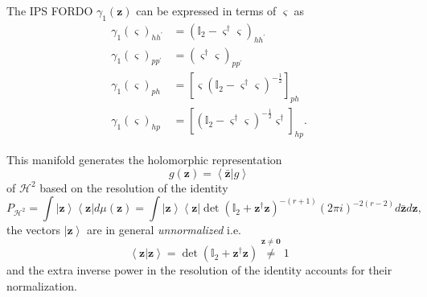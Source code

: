 \documentclass[aps,preprint]{revtex4}%
\begin{document}
The IPS FORDO $\gamma_{1}\left(  \mathbf{z}\right)  $ can be expressed in
terms of $\mathbf{\varsigma}$ as
\begin{align}
\gamma_{1}\left(  \mathbf{\varsigma}\right)  _{hh^{\prime}}  &  =\left(
\mathbb{I}_{2}-\mathbf{\varsigma}^{\dagger}\mathbf{\varsigma}\right)
_{hh^{\prime}}\nonumber\\
\gamma_{1}\left(  \mathbf{\varsigma}\right)  _{pp^{\prime}}  &  =\left(
\mathbf{\varsigma}^{\dagger}\mathbf{\varsigma}\right)  _{pp^{\prime}%
}\nonumber\\
\gamma_{1}\left(  \mathbf{\varsigma}\right)  _{ph}  &  =\left[
\mathbf{\varsigma}\left(  \mathbb{I}_{2}-\mathbf{\varsigma}^{\dagger
}\mathbf{\varsigma}\right)  ^{-\frac{1}{2}}\right]  _{ph}\nonumber\\
\gamma_{1}\left(  \mathbf{\varsigma}\right)  _{hp}  &  =\left[  \left(
\mathbb{I}_{2}-\mathbf{\varsigma}^{\dagger}\mathbf{\varsigma}\right)
^{-\frac{1}{2}}\mathbf{\varsigma}^{\dagger}\right]  _{hp}.
\end{align}


This manifold generates the holomorphic representation
\begin{equation}
g\left(  \mathbf{z}\right)  =\left\langle \mathbf{\bar{z}}\left\vert g\right.
\right\rangle
\end{equation}
of $\mathcal{H}^{2}$ based on the resolution of the identity
\cite{Blaiz&Orland}
\begin{equation}
P_{\mathcal{H}^{2}}=\int\left\vert \mathbf{z}\right\rangle \left\langle
\mathbf{z}\right\vert d\mu\left(  \mathbf{z}\right)  =\int\left\vert
\mathbf{z}\right\rangle \left\langle \mathbf{z}\right\vert \det\left(
\mathbb{I}_{2}+\mathbf{z}^{\dagger}\mathbf{z}\right)  ^{-\left(  r+1\right)
}\left(  2\pi i\right)  ^{-2\left(  r-2\right)  }d\mathbf{\bar{z}}d\mathbf{z},
\end{equation}
the vectors $\left\vert \mathbf{z}\right\rangle $ are in general
\emph{unnormalized} i.e.%
\begin{equation}
\left\langle \mathbf{z}\left\vert \mathbf{z}\right.  \right\rangle
=\det\left(  \mathbb{I}_{2}+\mathbf{z}^{\dagger}\mathbf{z}\right)
\overset{\mathbf{z\neq0}}{\neq}1
\end{equation}
and the extra inverse power in the resolution of the identity accounts for
their normalization.
\end{document}

